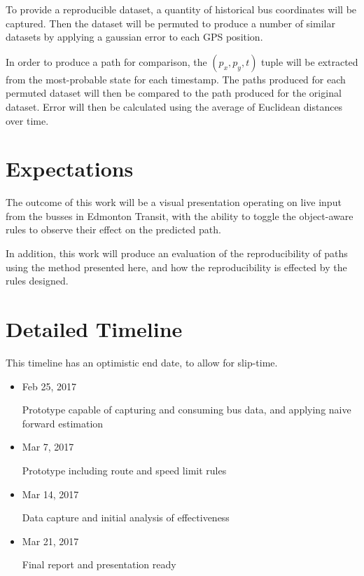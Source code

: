 \documentclass{article}
\begin{document}
To provide a reproducible dataset, a quantity of historical bus coordinates will be captured.
Then the dataset will be permuted to produce a number of similar datasets by applying a gaussian error to each GPS position.

In order to produce a path for comparison, the $(p_x, p_y, t)$ tuple will be extracted from the most-probable state for each timestamp.
The paths produced for each permuted dataset will then be compared to the path produced for the original dataset. Error will then be calculated using the average of Euclidean distances over time.

\section{Expectations}

The outcome of this work will be a visual presentation operating on live input from the busses in Edmonton Transit, with the ability to toggle the object-aware rules to observe their effect on the predicted path.

In addition, this work will produce an evaluation of the reproducibility of paths using the method presented here, and how the reproducibility is effected by the rules designed.

\section{Detailed Timeline}
  This timeline has an optimistic end date, to allow for slip-time.

    \begin{itemize}
        \item Feb 25, 2017

        Prototype capable of capturing and consuming bus data, and applying naive forward estimation

        \item Mar 7, 2017

        Prototype including route and speed limit rules

        \item Mar 14, 2017

        Data capture and initial analysis of effectiveness

        \item Mar 21, 2017

        Final report and presentation ready
    \end{itemize}



\end{document}
